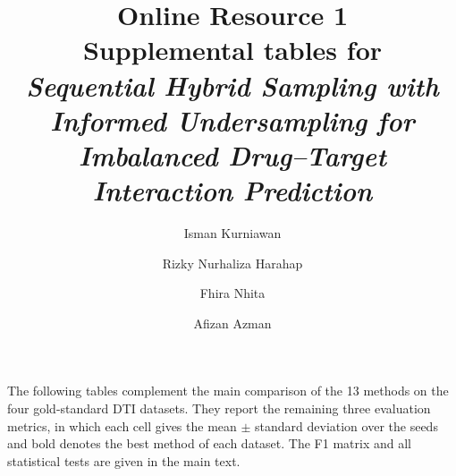\documentclass[10pt,a4paper]{article}
\title{Online Resource 1\\ Supplemental tables for\\
  \emph{Sequential Hybrid Sampling with Informed Undersampling for
  Imbalanced Drug--Target Interaction Prediction}}
\author{Isman Kurniawan \and Rizky Nurhaliza Harahap \and Fhira Nhita \and Afizan Azman}
\date{}
\begin{document}
\maketitle

The following tables complement the main comparison of the 13 methods on
the four gold-standard DTI datasets. They report the remaining three
evaluation metrics, in which each cell gives the mean $\pm$ standard
deviation over the seeds and bold denotes the best method of each
dataset. The F1 matrix and all statistical tests are given in the main
text.

\begin{table}[htbp]
\centering
\caption{The G-Mean scores (mean $\pm$ SD) of the 13 methods on the four
datasets.}
\end{table}

\begin{table}[htbp]
\centering
\caption{The balanced accuracy scores (mean $\pm$ SD) of the 13 methods
on the four datasets.}
\end{table}

\begin{table}[htbp]
\centering
\caption{The AUPRC values (mean $\pm$ SD) of the 13 methods on the four
datasets.}
\end{table}
\end{document}
